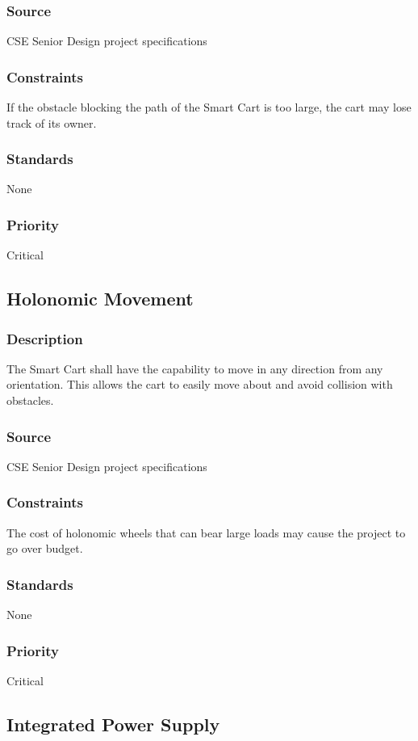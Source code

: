 \subsubsection{Source}
CSE Senior Design project specifications
\subsubsection{Constraints}
If the obstacle blocking the path of the Smart Cart is too large, the cart may lose track of its owner. 
\subsubsection{Standards}
None
\subsubsection{Priority}
Critical

\subsection{Holonomic Movement}
\subsubsection{Description}
The Smart Cart shall have the capability to move in any direction from any orientation. This allows the cart to easily move about and avoid collision with obstacles.
\subsubsection{Source}
CSE Senior Design project specifications
\subsubsection{Constraints}
The cost of holonomic wheels that can bear large loads may cause the project to go over budget.
\subsubsection{Standards}
None
\subsubsection{Priority}
Critical

\subsection{Integrated Power Supply}
